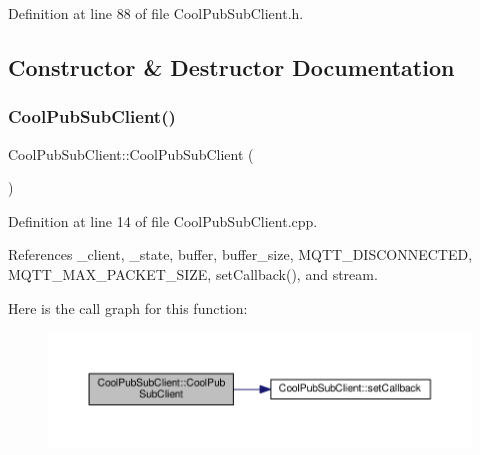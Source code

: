 Definition at line 88 of file Cool\+Pub\+Sub\+Client.\+h.



\subsection{Constructor \& Destructor Documentation}
\mbox{\label{class_cool_pub_sub_client_a2e54e36217bb0969b91b5dee9a27410f}} 
\subsubsection{\texorpdfstring{Cool\+Pub\+Sub\+Client()}{CoolPubSubClient()}\hspace{0.1cm}{\footnotesize\ttfamily [1/14]}}
{\footnotesize\ttfamily Cool\+Pub\+Sub\+Client\+::\+Cool\+Pub\+Sub\+Client (\begin{DoxyParamCaption}{ }\end{DoxyParamCaption})}



Definition at line 14 of file Cool\+Pub\+Sub\+Client.\+cpp.



References \+\_\+client, \+\_\+state, buffer, buffer\+\_\+size, M\+Q\+T\+T\+\_\+\+D\+I\+S\+C\+O\+N\+N\+E\+C\+T\+ED, M\+Q\+T\+T\+\_\+\+M\+A\+X\+\_\+\+P\+A\+C\+K\+E\+T\+\_\+\+S\+I\+ZE, set\+Callback(), and stream.

Here is the call graph for this function\+:\nopagebreak
\begin{figure}[H]
\begin{center}
\leavevmode
\includegraphics[width=350pt]{d8/d4b/class_cool_pub_sub_client_a2e54e36217bb0969b91b5dee9a27410f_cgraph}
\end{center}
\end{figure}
\mbox{\label{class_cool_pub_sub_client_a0563a12cb4e9339bf2605cfc655e717d}} 
